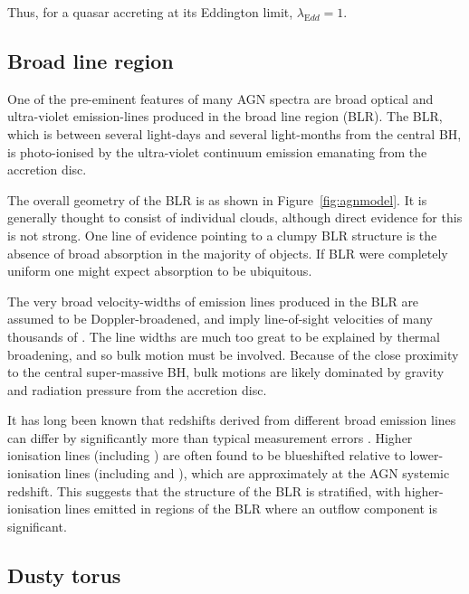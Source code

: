 Thus, for a quasar accreting at its Eddington limit, $\lambda_{\mathrm Edd} = 1$.

\subsection{Broad line region}

One of the pre-eminent features of many AGN spectra are broad optical and ultra-violet emission-lines produced in the broad line region (BLR).
The BLR, which is between several light-days and several light-months from the central BH, is photo-ionised by the ultra-violet continuum emission emanating from the accretion disc.

The overall geometry of the BLR is as shown in Figure~\ref{fig:agnmodel}.
It is generally thought to consist of individual clouds, although direct evidence for this is not strong.
One line of evidence pointing to a clumpy BLR structure is the absence of broad  absorption in the majority of objects.
If BLR were completely uniform one might expect  absorption to be ubiquitous.

The very broad velocity-widths of emission lines produced in the BLR are assumed to be Doppler-broadened, and imply line-of-sight velocities of many thousands of \kms.
The line widths are much too great to be explained by thermal broadening, and so bulk motion must be involved.
Because of the close proximity to the central super-massive BH, bulk motions are likely dominated by gravity and radiation pressure from the accretion disc.

It has long been known that redshifts derived from different broad emission lines can differ by significantly more than typical measurement errors \citep[e.g.][]{gaskell82}.
Higher ionisation lines (including ) are often found to be blueshifted relative to lower-ionisation lines (including  and \hbns), which are approximately at the AGN systemic redshift.
This suggests that the structure of the BLR is stratified, with higher-ionisation lines emitted in regions of the BLR where an outflow component is significant.

\subsection{Dusty torus}

